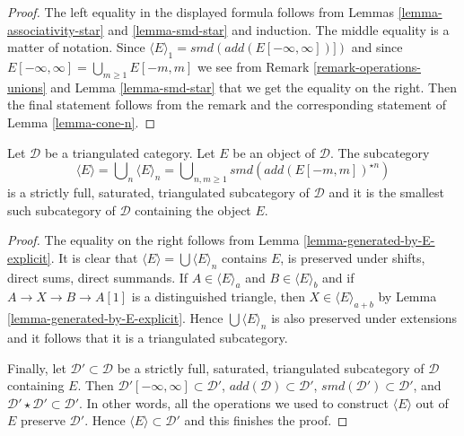 \begin{proof}
The left equality in the displayed formula follows from
Lemmas \ref{lemma-associativity-star} and \ref{lemma-smd-star}
and induction. The middle equality is a matter of notation.
Since $\langle E \rangle_1 = smd(add(E[-\infty, \infty])])$
and since $E[-\infty, \infty] = \bigcup_{m \geq 1} E[-m, m]$
we see from Remark \ref{remark-operations-unions} and
Lemma \ref{lemma-smd-star} that we get the equality on the right.
Then the final statement follows from the remark and the
corresponding statement of Lemma \ref{lemma-cone-n}.
\end{proof}

\begin{lemma}
\label{lemma-find-smallest-containing-E}
Let $\mathcal{D}$ be a triangulated category. Let $E$ be an object
of $\mathcal{D}$. The subcategory
$$
\langle E \rangle = \bigcup\nolimits_n \langle E \rangle_n
= \bigcup\nolimits_{n, m \geq 1} smd(add(E[-m, m])^{\star n})
$$
is a strictly full, saturated, triangulated subcategory of $\mathcal{D}$
and it is the smallest such subcategory of $\mathcal{D}$ containing
the object $E$.
\end{lemma}

\begin{proof}
The equality on the right follows from
Lemma \ref{lemma-generated-by-E-explicit}.
It is clear that $\langle E \rangle = \bigcup \langle E \rangle_n$
contains $E$, is preserved under shifts, direct sums, direct summands.
If $A \in \langle E \rangle_a$ and $B \in \langle E \rangle_b$
and if $A \to X \to B \to A[1]$ is a distinguished triangle, then
$X \in \langle E \rangle_{a + b}$ by Lemma \ref{lemma-generated-by-E-explicit}.
Hence $\bigcup \langle E \rangle_n$ is also preserved under extensions
and it follows that it is a triangulated subcategory. 

\medskip\noindent
Finally, let $\mathcal{D}' \subset \mathcal{D}$ be a 
strictly full, saturated, triangulated subcategory of $\mathcal{D}$
containing $E$. Then
$\mathcal{D}'[-\infty, \infty] \subset \mathcal{D}'$,
$add(\mathcal{D}) \subset \mathcal{D}'$,
$smd(\mathcal{D}') \subset \mathcal{D}'$, and
$\mathcal{D}' \star \mathcal{D}' \subset \mathcal{D}'$.
In other words, all the operations we used to construct
$\langle E \rangle$ out of $E$ preserve $\mathcal{D}'$.
Hence $\langle E \rangle \subset \mathcal{D}'$ and this
finishes the proof.
\end{proof}

